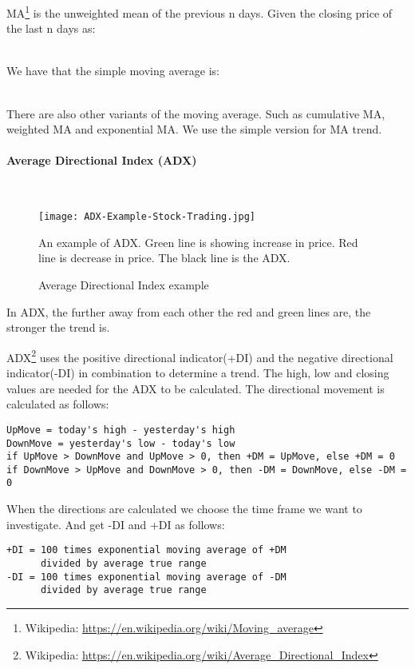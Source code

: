 MA\footnote{Wikipedia: \url{https://en.wikipedia.org/wiki/Moving_average}} is
the unweighted mean of the previous n days. Given the closing price of the last
n days as: 

\\

We have that the simple moving average is: 

\\

There are also other variants of the moving average. Such as cumulative MA,
weighted MA and exponential MA. We use the simple version for MA trend. 

\paragraph{Average Directional Index (ADX)}
\hspace{0pt}\\
\begin{figure}[htb]
    \centering
    \texttt{[image: ADX-Example-Stock-Trading.jpg]}
    \label{fig:ADX-Example-Stock-Trading}
    \caption{Average Directional Index example}
An example of ADX. Green line is showing increase in price. Red line is
decrease in price. The black line is the ADX.
\end{figure}
In ADX, the further away from each other the red and green lines are, the
stronger the trend is. 

ADX\footnote{Wikipedia:
\url{https://en.wikipedia.org/wiki/Average_Directional_Index}} uses the positive directional indicator(+DI) and the negative directional
indicator(-DI) in combination to determine a trend. The high, low and closing
values are needed for the ADX to be calculated. The directional movement is
calculated as follows: 
\begin{verbatim}
UpMove = today's high - yesterday's high
DownMove = yesterday's low - today's low
if UpMove > DownMove and UpMove > 0, then +DM = UpMove, else +DM = 0
if DownMove > UpMove and DownMove > 0, then -DM = DownMove, else -DM = 0 
\end{verbatim} 

When the directions are calculated we choose the time frame we want to
investigate. And get -DI and +DI as follows:
\begin{verbatim}
+DI = 100 times exponential moving average of +DM 
      divided by average true range
-DI = 100 times exponential moving average of -DM 
      divided by average true range 
\end{verbatim} 

